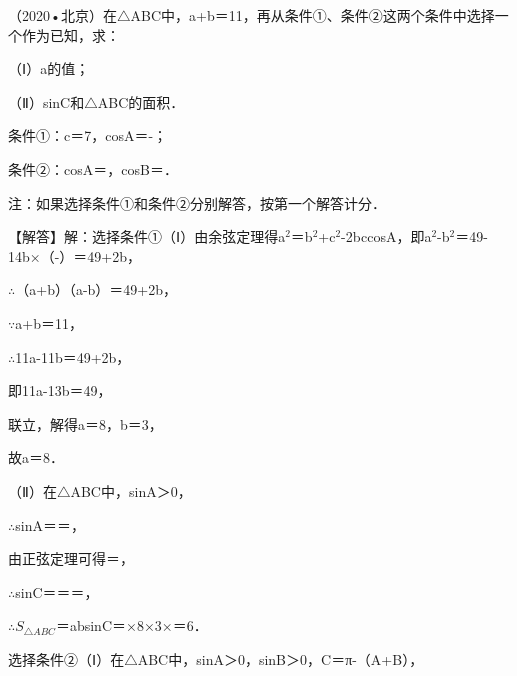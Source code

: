 \begin{question}
（2020•北京）在$\triangle$ABC中，a+b＝11，再从条件①、条件②这两个条件中选择一个作为已知，求：\par
（Ⅰ）a的值；\par
（Ⅱ）sinC和$\triangle$ABC的面积．\par
条件①：c＝7，cosA＝-\allowbreak{}；\par
条件②：cosA＝\allowbreak{}，cosB＝\allowbreak{}．\par
注：如果选择条件①和条件②分别解答，按第一个解答计分．\par
\begin{solution}
【解答】解：选择条件①（Ⅰ）由余弦定理得a$^{2}$＝b$^{2}$+c$^{2}$-2bccosA，即a$^{2}$-b$^{2}$＝49-14b×（-\allowbreak{}）＝49+2b，\par
$\therefore$（a+b）（a-b）＝49+2b，\par
$\because$a+b＝11，\par
$\therefore$11a-11b＝49+2b，\par
即11a-13b＝49，\par
联立\allowbreak{}，解得a＝8，b＝3，\par
故a＝8．\par
（Ⅱ）在$\triangle$ABC中，sinA＞0，\par
$\therefore$sinA＝\allowbreak{}＝\allowbreak{}，\par
由正弦定理可得\allowbreak{}＝\allowbreak{}，\par
$\therefore$sinC＝\allowbreak{}＝\allowbreak{}＝\allowbreak{}，\par
$\therefore$$S_{\triangle ABC}$＝\allowbreak{}absinC＝\allowbreak{}×8×3×\allowbreak{}＝6\allowbreak{}．\par
选择条件②（Ⅰ）在$\triangle$ABC中，sinA＞0，sinB＞0，C＝π-（A+B），\par
$$
\end{solution}
\end{question}
